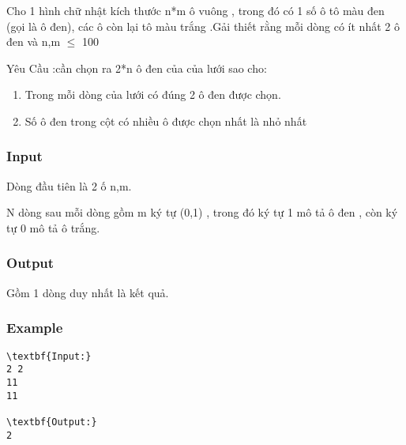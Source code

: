 

Cho 1 hình chữ nhật kích thước n*m ô vuông , trong đó có 1 số ô tô màu đen (gọi là ô đen), các ô còn lại tô màu trắng .Gải thiết rằng mỗi dòng có ít nhất 2 ô đen và n,m $\le$ 100

Yêu Cầu :cần chọn ra 2*n ô đen của của lưới sao cho:
\begin{enumerate}
	\item Trong mỗi dòng của lưới có đúng 2 ô đen được chọn.
	\item Số ô đen trong cột có nhiều ô được chọn nhất là nhỏ nhất
\end{enumerate}

\subsubsection{Input}

Dòng đầu tiên là 2 ố n,m.

N dòng sau mỗi dòng gồm m ký tự (0,1) , trong đó ký tự 1 mô tả ô đen , còn ký tự 0 mô tả ô trắng.

\subsubsection{Output}

Gồm 1 dòng duy nhất là kết quả.

\subsubsection{Example}
\begin{verbatim}
\textbf{Input:}
2 2
11
11

\textbf{Output:}
2\end{verbatim}
